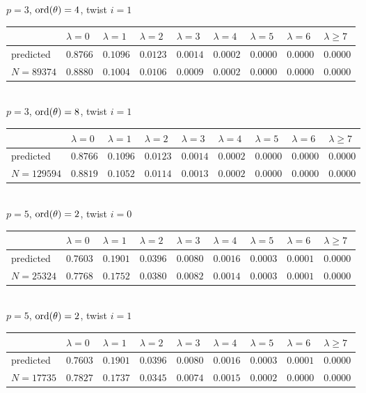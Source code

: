 \documentclass[pdflatex,sn-mathphys-num]{sn-jnl}%
\theoremstyle{plain}
\theoremstyle{definition}
\theoremstyle{remark}
\numberwithin{equation}{section}
\newcommand{\ord}{\text{\rm ord}}
\begin{document}
\noindent $p=3$, $\ord(\theta)=4$,  twist $i=1$\\
\begin{tabular}{|l|l|l|l|l|l|l|l|l|} \hline
& $\lambda=0$ & $\lambda=1$ & $\lambda=2$ & $\lambda=3$ & $\lambda=4$ & $\lambda=5$ & $\lambda=6$ & $\lambda\geq 7$ \\ \hline
predicted & $0.8766$ & $0.1096$ &  $0.0123$ & $0.0014$ &  $0.0002$ & $0.0000$ &  $0.0000$ &  $0.0000$  \\ \hline
$N=89374$ & $0.8880$ & $0.1004$ & $0.0106$ & $0.0009$ & $0.0002$ & $0.0000$ & $0.0000$ & $0.0000$ \\ \hline
\end{tabular}\\



\noindent $p=3$, $\ord(\theta)=8$,  twist $i=1$\\
\begin{tabular}{|l|l|l|l|l|l|l|l|l|} \hline
& $\lambda=0$ & $\lambda=1$ & $\lambda=2$ & $\lambda=3$ & $\lambda=4$ & $\lambda=5$ & $\lambda=6$ & $\lambda\geq 7$ \\ \hline
predicted & $0.8766$ & $0.1096$ &  $0.0123$ & $0.0014$ &  $0.0002$ & $0.0000$ &  $0.0000$ &  $0.0000$  \\ \hline
$N=129594$ &  $0.8819$ & $0.1052$ & $0.0114$ & $0.0013$ & $0.0002$ & $0.0000$ & $0.0000$ & $0.0000$ \\ \hline
\end{tabular}\\

\noindent $p=5$, $\ord(\theta)=2$,  twist $i=0$\\
\begin{tabular}{|l|l|l|l|l|l|l|l|l|} \hline
& $\lambda=0$ & $\lambda=1$ & $\lambda=2$ & $\lambda=3$ & $\lambda=4$ & $\lambda=5$ & $\lambda=6$ & $\lambda\geq 7$ \\ \hline
predicted & $0.7603$ &  $0.1901$ &  $0.0396$ &  $0.0080$ &  $0.0016$ & $0.0003$ &  $0.0001$ & $0.0000$ \\ \hline
$N=25324$ &
$0.7768$ & $0.1752$ & $0.0380$ & $0.0082$ & $0.0014$ & $0.0003$ & $0.0001$ & $0.0000$ \\ \hline
\end{tabular}\\



\noindent $p=5$, $\ord(\theta)=2$,  twist $i=1$\\
\begin{tabular}{|l|l|l|l|l|l|l|l|l|} \hline
& $\lambda=0$ & $\lambda=1$ & $\lambda=2$ & $\lambda=3$ & $\lambda=4$ & $\lambda=5$ & $\lambda=6$ & $\lambda\geq 7$ \\ \hline
predicted & $0.7603$ &  $0.1901$ &  $0.0396$ &  $0.0080$ &  $0.0016$ & $0.0003$ &  $0.0001$ & $0.0000$ \\ \hline
$N=17735$ & $0.7827$ & $0.1737$ & $0.0345$ & $0.0074$ & $0.0015$ & $0.0002$ & $0.0000$ & $0.0000$ \\ \hline
\end{tabular}\\
\end{document}
